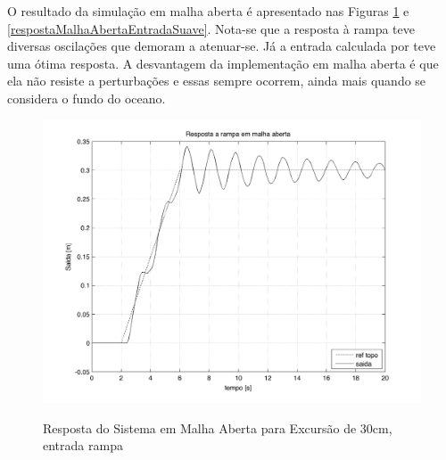  O resultado da simulação em malha aberta é apresentado nas Figuras \ref{respostaMalhaAbertaRampa} e \ref{respostaMalhaAbertaEntradaSuave}. Nota-se que a resposta à rampa teve diversas oscilações que demoram a atenuar-se. Já a entrada calculada por \cite{rafaelMestrado} teve uma ótima resposta. A desvantagem da implementação em malha aberta é que ela não resiste a perturbações e essas sempre ocorrem, ainda mais quando se considera o fundo do oceano.
 
 \begin{figure}[!htb]
    \centering
    \begin{minipage}{.45\textwidth}
        \centering
        
        \includegraphics[width=1\linewidth]{figs/resultados/simulacao/respostaMalhaAbertaRampa}
        \label{respostaMalhaAbertaRampa}
        \caption{Resposta do Sistema em Malha Aberta para Excursão de 30cm, entrada rampa}
    \end{minipage}%
    \hspace{0.1cm}
    \begin{minipage}{0.45\textwidth}
        \centering
        

\end{minipage}
\end{figure}

